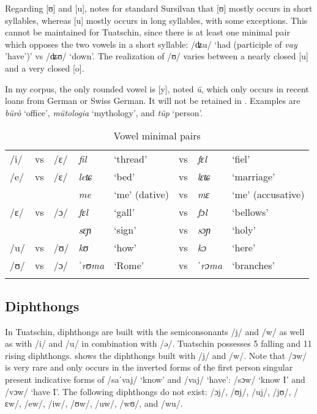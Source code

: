 Regarding [ʊ] and [u], \citet[130]{Liver2010} notes for standard Sursilvan that [ʊ] mostly occurs in short syllables, whereas [u] mostly occurs in long syllables, with some exceptions. This cannot be maintained for Tuatschin, since there is at least one minimal pair which opposes the two vowels in a short syllable: /ʥu/ `had (participle of \textit{vay} 'have')' vs /ʥʊ/ `down'. The realization of /ʊ/ varies between a nearly closed [u] and a very closed [o].

In my corpus, the only rounded vowel is [y], noted \textit{ü}, which only occurs in recent loans from German or Swiss German. It will not be retained in . Examples are \textit{bürò} `office', \textit{mütologia} `mythology', and \textit{tüp} `person'.


\begin{table}
	\caption{Vowel minimal pairs}
	\label{vmp}
	\begin{tabular}{llllllll}
	 \lsptoprule
		/i/&vs&/ɛ/& \textit{fil} &`thread' &vs& \textit{fɛl}&`fiel'\\
		/e/&vs&/ɛ/&\textit{leʨ} &`bed'&vs&\textit{lɛʨ} &`marriage'\\
		&&&\textit{me}&`me' (dative) & vs &\textit{mɛ} & `me' (accusative) \\
		/ɛ/&vs&/ɔ/&\textit{fɛl} &`gall’ &vs & \textit{fɔl} & `bellows’\\
		&&&\textit{sɛɲ} &`sign’ & vs & \textit{sɔɲ} & `holy’\\
		/u/&vs&/ʊ/&\textit{kʊ} & `how’ &vs& \textit{kɔ} &`here’\\
	/ʊ/ & vs & /ɔ/ & \textit{ˈrʊma} & `Rome' &vs & \textit{ˈrɔma} & `branches'\\
		\lspbottomrule
	\end{tabular}
\end{table}


\subsection{Diphthongs}
In Tuatschin, diphthongs are built with the semiconsonants /j/ and /w/ as well as with /i/ and /u/ in combination with /ə/. Tuatschin possesses 5 falling and 11 rising diphthongs.  shows the diphthongs built with /j/ and /w/. Note that /ɔw/ is very rare and only occurs in the inverted forms of the first person singular present indicative forms of /saˈvaj/ `know' and /vaj/ `have': /sɔw/ `know I' and /vɔw/ `have I'. The following diphthongs do not exist: /ɔj/, /ʊj/, /uj/, /jʊ/, /ɛw/, /ew/, /iw/, /ʊw/, /uw/, /wʊ/, and /wu/.

